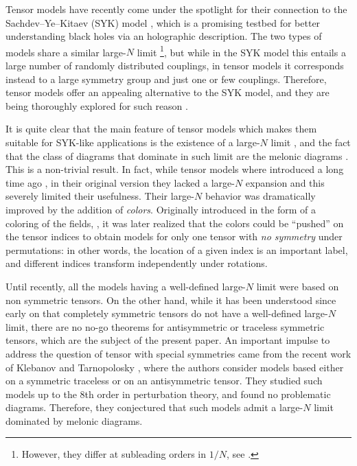 \documentclass[10pt]{article}
\theoremstyle{plain}
\theoremstyle{definition}
\begin{document}
Tensor models \cite{review,RTM} have recently come under the spotlight for their connection to the Sachdev--Ye--Kitaev (SYK)  
model \cite{Sachdev:1992fk,Kitaev,Polchinski:2016xgd,Jevicki:2016bwu,Maldacena:2016hyu,Gross:2016kjj,Gross:2017aos}, which is a promising testbed for better understanding black holes via an holographic description.
The two types of models share a similar large-$N$ limit \cite{Witten:2016iux,Klebanov:2016xxf}\footnote{However, they differ at subleading orders in $1/N$, see \cite{Bonzom:2017pqs}.}, but while in the SYK model this entails a large number of randomly distributed couplings, in tensor models it corresponds instead to a large symmetry group and just one or few couplings.
Therefore, tensor models offer an appealing alternative to the SYK model, and they are being thoroughly explored for such reason  
\cite{Peng:2016mxj,Krishnan:2016bvg,Krishnan:2017txw,Choudhury:2017tax,Giombi:2017dtl,Bulycheva:2017ilt,Krishnan:2017lra,Ferrari:2017jgw,Prakash:2017hwq,Peng:2017kro,Benedetti:2017fmp,BenGeloun:2017jbi}.

It is quite clear that the main feature of tensor models which makes them suitable for SYK-like applications is the existence of a large-$N$ limit \cite{color,expansion1}, and the fact that the class of diagrams that dominate in such limit are the melonic 
diagrams \cite{critical,uncoloring}.
This is a non-trivial result. In fact, while tensor models where introduced a long time ago \cite{ambj3dqg,sasa1}, in their original version they lacked a large-$N$ expansion and this severely limited their usefulness. Their large-$N$ behavior 
was dramatically improved by the addition of \emph{colors}. Originally introduced in the form of a coloring of the fields, \cite{color,expansion1}, it was later realized that the colors could be 
``pushed'' on the tensor indices \cite{uncoloring,sdequations,Carrozza:2015adg} to obtain models for only one tensor with \emph{no symmetry} under permutations: in other words, the location of a given 
index is an important label, and different indices transform independently under rotations.


Until recently, all the models having a well-defined large-$N$ limit were based on non symmetric tensors. 
On the other hand, while it has been understood since early on that completely symmetric tensors do not have a  well-defined large-$N$ limit, there are no no-go theorems for antisymmetric or traceless symmetric tensors, which are the subject of
the present paper. An important impulse to address the question of tensor with special symmetries came from the recent work of Klebanov and Tarnopolosky \cite{Klebanov:2017nlk}, where the authors consider models based either on a
symmetric traceless or on an antisymmetric tensor. They studied such models up to the 8th order in perturbation theory, and found no problematic diagrams. Therefore, they conjectured that such models admit a large-$N$ limit dominated by melonic 
diagrams.
\end{document}
